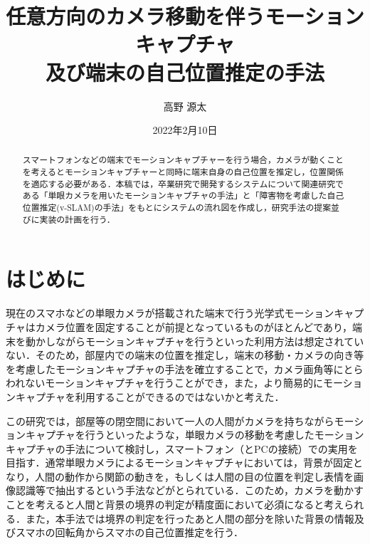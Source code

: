 \documentclass[11pt]{jreport}
\title{任意方向のカメラ移動を伴うモーションキャプチャ \\
        及び端末の自己位置推定の手法}
\author{高野 源太}
\date{2022年2月10日}	%
\begin{document}
\maketitle

\begin{abstract}
スマートフォンなどの端末でモーションキャプチャーを行う場合，カメラが動くことを考えるとモーションキャプチャーと同時に端末自身の自己位置を推定し，位置関係を適応する必要がある．本稿では，卒業研究で開発するシステムについて関連研究である「単眼カメラを用いたモーションキャプチャの手法」と「障害物を考慮した自己位置推定(v-SLAM)の手法」をもとにシステムの流れ図を作成し，研究手法の提案並びに実装の計画を行う．
\end{abstract}

\tableofcontents



\newpage
{}	%



\chapter{はじめに}
現在のスマホなどの単眼カメラが搭載された端末で行う光学式モーションキャプチャはカメラ位置を固定することが前提となっているものがほとんどであり，端末を動かしながらモーションキャプチャを行うといった利用方法は想定されていない．そのため，部屋内での端末の位置を推定し，端末の移動・カメラの向き等を考慮したモーションキャプチャの手法を確立することで，カメラ画角等にとらわれないモーションキャプチャを行うことができ，また，より簡易的にモーションキャプチャを利用することができるのではないかと考えた．

この研究では，部屋等の閉空間において一人の人間がカメラを持ちながらモーションキャプチャを行うといったような，単眼カメラの移動を考慮したモーションキャプチャの手法について検討し，スマートフォン（とPCの接続）での実用を目指す．通常単眼カメラによるモーションキャプチャにおいては，背景が固定となり，人間の動作から関節の動きを，もしくは人間の目の位置を判定し表情を画像認識等で抽出するという手法などがとられている．このため，カメラを動かすことを考えると人間と背景の境界の判定が精度面において必須になると考えられる．また，本手法では境界の判定を行ったあと人間の部分を除いた背景の情報及びスマホの回転角からスマホの自己位置推定を行う．
\end{document}

